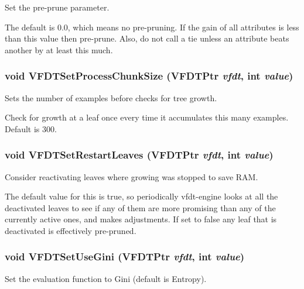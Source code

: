 Set the pre-prune parameter. 

The default is 0.0, which means no pre-pruning. If the gain of all attributes is less than this value then pre-prune. Also, do not call a tie unless an attribute beats another by at least this much. 
\subsubsection{\setlength{\rightskip}{0pt plus 5cm}void VFDTSet\-Process\-Chunk\-Size ({\bf VFDTPtr} {\em vfdt}, int {\em value})}\label{vfdt-engine_8h_a8}


Sets the number of examples before checks for tree growth. 

Check for growth at a leaf once every time it accumulates this many examples. Default is 300. 
\subsubsection{\setlength{\rightskip}{0pt plus 5cm}void VFDTSet\-Restart\-Leaves ({\bf VFDTPtr} {\em vfdt}, int {\em value})}\label{vfdt-engine_8h_a10}


Consider reactivating leaves where growing was stopped to save RAM. 

The default value for this is true, so periodically vfdt-engine looks at all the deactivated leaves to see if any of them are more promising than any of the currently active ones, and makes adjustments. If set to false any leaf that is deactivated is effectively pre-pruned. 
\subsubsection{\setlength{\rightskip}{0pt plus 5cm}void VFDTSet\-Use\-Gini ({\bf VFDTPtr} {\em vfdt}, int {\em value})}\label{vfdt-engine_8h_a9}


Set the evaluation function to Gini (default is Entropy). 

